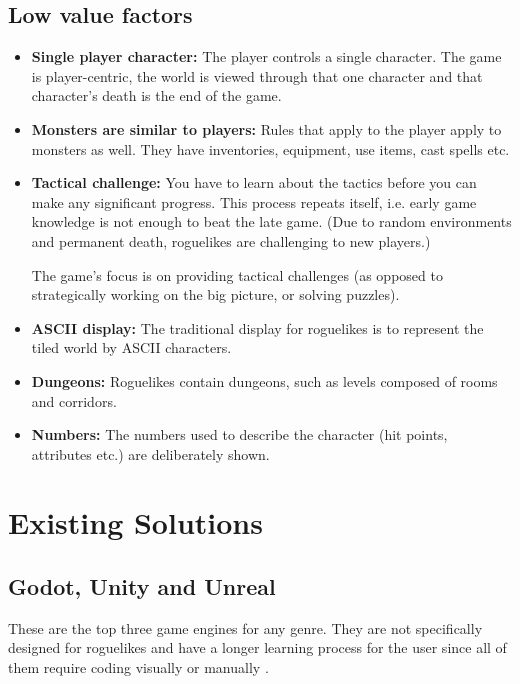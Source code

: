 \documentclass{article}
\begin{document}
\subsection*{Low value factors} 
\begin{itemize}
    \item \textbf{Single player character:}
    The player controls a single character. The game is player-centric, 
    the world is viewed through that one character and that character's 
    death is the end of the game. 
    
    \item \textbf{Monsters are similar to players:}
    Rules that apply to the player apply to monsters as well. They have 
    inventories, equipment, use items, cast spells etc. 
    
    \item \textbf{Tactical challenge:}
    You have to learn about the tactics before you can make any 
    significant progress. This process repeats itself, i.e. early game 
    knowledge is not enough to beat the late game. (Due to random 
    environments and permanent death, roguelikes are challenging to new 
    players.) 
    
    The game's focus is on providing tactical challenges (as opposed to 
    strategically working on the big picture, or solving puzzles). 
    
    \item \textbf{ASCII display:}
    The traditional display for roguelikes is to represent the tiled world 
    by ASCII characters. 
    
    \item \textbf{Dungeons:}
    Roguelikes contain dungeons, such as levels composed of rooms and 
    corridors. 
    
    \item \textbf{Numbers:}
    The numbers used to describe the character (hit points, attributes 
    etc.) are deliberately shown. 
\end{itemize}

\section{Existing Solutions}
\subsection{Godot, Unity and Unreal}
These are the top three game engines for any genre. They are not specifically designed for roguelikes and have a longer learning process for the user since all of them require coding visually or manually \cite{godot}\cite{unity}\cite{unreal}.
\end{document}
